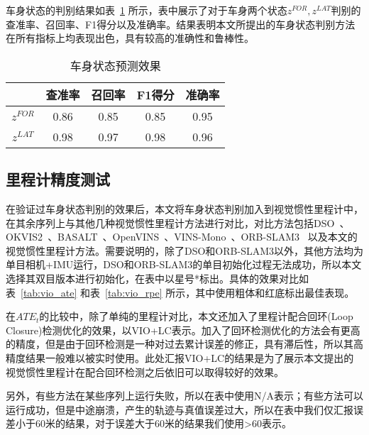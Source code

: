 车身状态的判别结果如表~\ref{tab:pose_detection} 所示，表中展示了对于车身两个状态$z^{FOR},z^{LAT}$判别的查准率、召回率、F1得分以及准确率。结果表明本文所提出的车身状态判别方法在所有指标上均表现出色，具有较高的准确性和鲁棒性。

\begin{table}
\centering
\caption{车身状态预测效果}
\begin{tabular}{ccccc}
\toprule
          & 查准率  & 召回率  & F1得分 & 准确率  \\
\midrule
$z^{FOR}$ & 0.86 & 0.85 & 0.85 & 0.95 \\
$z^{LAT}$ & 0.98 & 0.97 & 0.98 & 0.96 \\
\bottomrule
\end{tabular}
\label{tab:pose_detection}
\end{table}

\subsection{里程计精度测试}
在验证过车身状态判别的效果后，本文将车身状态判别加入到视觉惯性里程计中，在其余序列上与其他几种视觉惯性里程计方法进行对比，对比方法包括DSO~\cite{von2018direct}、OKVIS2~\cite{leutenegger2022okvis2}、BASALT~\cite{usenko2019visual}、OpenVINS~\cite{Geneva2020ICRA}、VINS-Mono~\cite{qin2018vins}、ORB-SLAM3~\cite{campos2021orb} 以及本文的视觉惯性里程计方法。需要说明的，除了DSO和ORB-SLAM3以外，其他方法均为单目相机+IMU运行，DSO和ORB-SLAM3的单目初始化过程无法成功，所以本文选择其双目版本进行初始化，在表中以星号*标出。具体的效果对比如表~\ref{tab:vio_ate} 和表~\ref{tab:vio_rpe} 所示，其中使用粗体和红底标出最佳表现。

在$ATE_t$的比较中，除了单纯的里程计对比，本文还加入了里程计配合回环(Loop Closure)检测优化的效果，以VIO+LC表示。加入了回环检测优化的方法会有更高的精度，但是由于回环检测是一种对过去累计误差的修正，具有滞后性，所以其高精度结果一般难以被实时使用。此处汇报VIO+LC的结果是为了展示本文提出的视觉惯性里程计在配合回环检测之后依旧可以取得较好的效果。

另外，有些方法在某些序列上运行失败，所以在表中使用N/A表示；有些方法可以运行成功，但是中途崩溃，产生的轨迹与真值误差过大，所以在表中我们仅汇报误差小于60米的结果，对于误差大于60米的结果我们使用\textgreater{}60表示。

